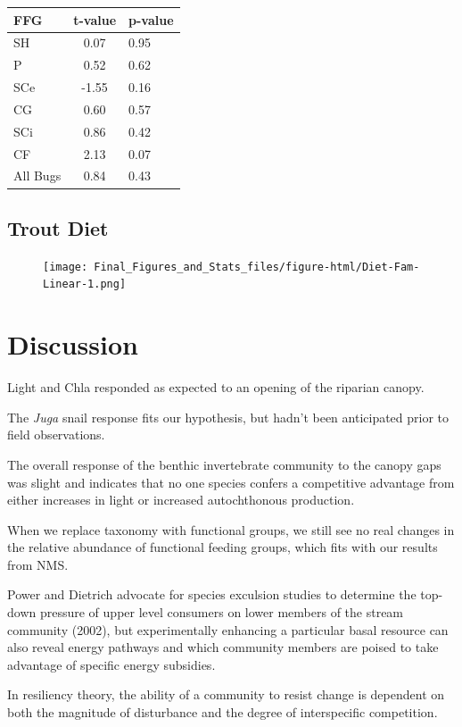 \documentclass[double,12pt]{beavtex}
\begin{document}
  \begin{longtable}[]{@{}lcl@{}}
  \toprule
  FFG & t-value & p-value\tabularnewline
  \midrule
  \endhead
  SH & 0.07 & 0.95\tabularnewline
  P & 0.52 & 0.62\tabularnewline
  SCe & -1.55 & 0.16\tabularnewline
  CG & 0.60 & 0.57\tabularnewline
  SCi & 0.86 & 0.42\tabularnewline
  CF & 2.13 & 0.07\tabularnewline
  All Bugs & 0.84 & 0.43\tabularnewline
  \bottomrule
  \end{longtable}
  
  \section*{Trout Diet}\label{trout-diet}
  
  \begin{figure}[htbp]
  \centering
  \texttt{[image: Final\_Figures\_and\_Stats\_files/figure-html/Diet-Fam-Linear-1.png]}
  \caption{}
  \end{figure}
  
  \chapter*{Discussion}\label{discussion}
  
  Light and Chla responded as expected to an opening of the riparian
  canopy.
  
  The \emph{Juga} snail response fits our hypothesis, but hadn't been
  anticipated prior to field observations.
  
  The overall response of the benthic invertebrate community to the canopy
  gaps was slight and indicates that no one species confers a competitive
  advantage from either increases in light or increased autochthonous
  production.
  
  When we replace taxonomy with functional groups, we still see no real
  changes in the relative abundance of functional feeding groups, which
  fits with our results from NMS.
  
  Power and Dietrich advocate for species exculsion studies to determine
  the top-down pressure of upper level consumers on lower members of the
  stream community (2002), but experimentally enhancing a particular basal
  resource can also reveal energy pathways and which community members are
  poised to take advantage of specific energy subsidies.
  
  In resiliency theory, the ability of a community to resist change is
  dependent on both the magnitude of disturbance and the degree of
  interspecific competition.
  
\end{document}
